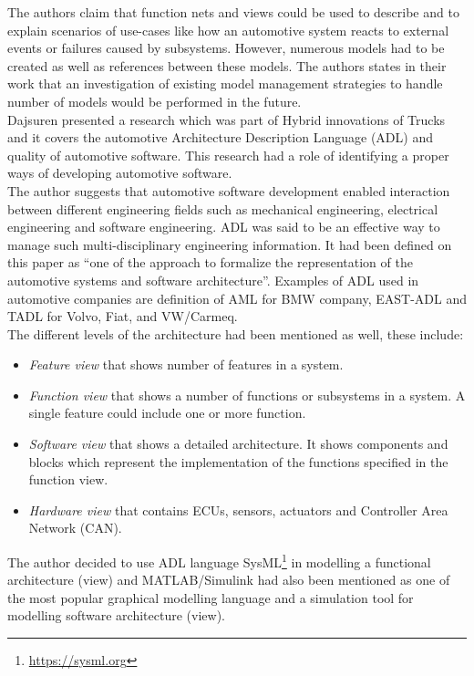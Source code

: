 The authors claim that function nets and views could be used to describe and to explain scenarios of use-cases like how an automotive system reacts to external events or failures caused by subsystems. However, numerous models had to be created as well as references between these models. The authors states in their work that an investigation of existing model management strategies to handle number of models would be performed in the future.\\

Dajsuren \cite{Dajsuren} presented a research which was part of Hybrid innovations of Trucks and it covers the automotive Architecture Description Language (ADL) and quality of automotive software. This research had a role of identifying a proper ways of developing automotive software. \\

The author suggests that automotive software development enabled interaction between different engineering fields such as mechanical engineering, electrical engineering and software engineering. ADL was said to be an effective way to manage such multi-disciplinary engineering information. It had been defined on this paper as ``one of the approach to formalize the representation of the automotive systems and software architecture''. Examples of ADL used in automotive companies are definition of AML for BMW company, EAST-ADL and TADL for Volvo, Fiat, and VW/Carmeq. \\

The different levels of the architecture had been mentioned as well, these include:
\begin{itemize}
    \item \textit{Feature view} that shows number of features in a system.
    \item \textit{Function view} that shows a number of functions or subsystems in a system. A single feature could include one or more function.
    \item \textit{Software view} that shows a detailed architecture. It shows components and blocks which represent the implementation of the functions specified in the function view.
    \item \textit{Hardware view} that contains ECUs, sensors, actuators and Controller Area Network (CAN).
\end{itemize}
\vspace{0.2cm}
The author decided to use ADL language SysML\footnote{\url{https://sysml.org}} in modelling a functional architecture (view) and MATLAB/Simulink had also been mentioned as one of the most popular graphical modelling language and a simulation tool for modelling software architecture (view). \\

